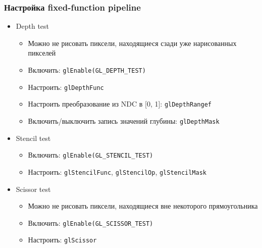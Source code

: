 \documentclass{beamer}
\begin{document}
\begin{frame}[fragile]
\frametitle{Настройка fixed-function pipeline}
\begin{itemize}
\item Depth test
\begin{itemize}
\item Можно не рисовать пиксели, находящиеся сзади уже нарисованных пикселей
\item Включить: \verb|glEnable(GL_DEPTH_TEST)|
\item Настроить: \verb|glDepthFunc|
\item Настроить преобразование из NDC в [0, 1]: \verb|glDepthRangef|
\item Включить/выключить запись значений глубины: \verb|glDepthMask|
\end{itemize}
\pause
\item Stencil test
\begin{itemize}
\item Включить: \verb|glEnable(GL_STENCIL_TEST)|
\item Настроить: \verb|glStencilFunc|, \verb|glStencilOp|, \verb|glStencilMask|
\end{itemize}
\pause
\item Scissor test
\begin{itemize}
\item Можно не рисовать пиксели, находящиеся вне некоторого прямоугольника
\item Включить: \verb|glEnable(GL_SCISSOR_TEST)|
\item Настроить: \verb|glScissor|
\end{itemize}
\end{itemize}
\end{frame}
\end{document}
